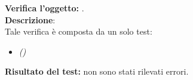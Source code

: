 \subsubsection{}
\textbf{Verifica l'oggetto:} \textit{}.\\
\textbf{Descrizione}:\\
Tale verifica è composta da un solo test:
\begin{itemize}
\item \textit{() }
\end{itemize}
\textbf{Risultato del test:} non sono stati rilevati errori.



